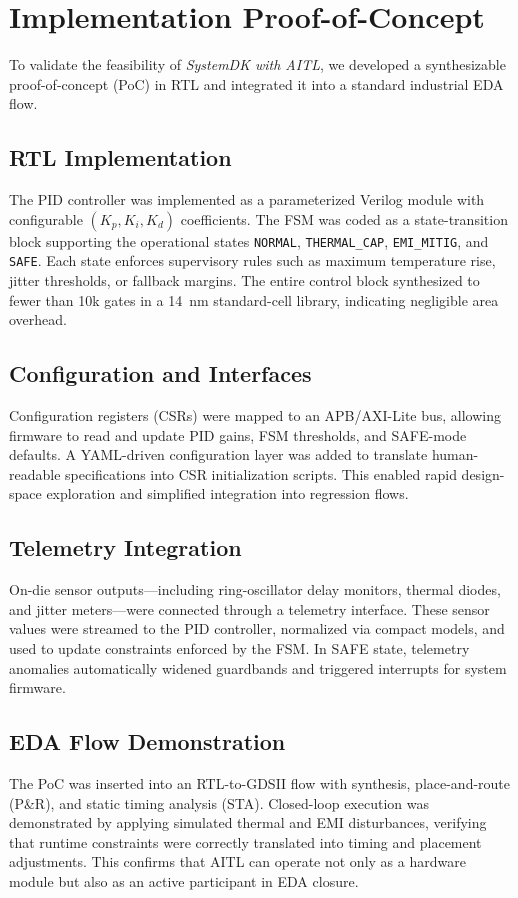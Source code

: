 \documentclass[conference]{IEEEtran}
\begin{document}
\section{Implementation Proof-of-Concept}

To validate the feasibility of \emph{SystemDK with AITL}, we developed a synthesizable proof-of-concept (PoC) in RTL and integrated it into a standard industrial EDA flow.

\subsection{RTL Implementation}
The PID controller was implemented as a parameterized Verilog module with configurable $(K_p,K_i,K_d)$ coefficients. The FSM was coded as a state-transition block supporting the operational states \texttt{NORMAL}, \texttt{THERMAL\_CAP}, \texttt{EMI\_MITIG}, and \texttt{SAFE}. Each state enforces supervisory rules such as maximum temperature rise, jitter thresholds, or fallback margins. The entire control block synthesized to fewer than 10k gates in a \SI{14}{\nano\meter} standard-cell library, indicating negligible area overhead.

\subsection{Configuration and Interfaces}
Configuration registers (CSRs) were mapped to an APB/AXI-Lite bus, allowing firmware to read and update PID gains, FSM thresholds, and SAFE-mode defaults. A YAML-driven configuration layer was added to translate human-readable specifications into CSR initialization scripts. This enabled rapid design-space exploration and simplified integration into regression flows.

\subsection{Telemetry Integration}
On-die sensor outputs—including ring-oscillator delay monitors, thermal diodes, and jitter meters—were connected through a telemetry interface. These sensor values were streamed to the PID controller, normalized via compact models, and used to update constraints enforced by the FSM. In SAFE state, telemetry anomalies automatically widened guardbands and triggered interrupts for system firmware.

\subsection{EDA Flow Demonstration}
The PoC was inserted into an RTL-to-GDSII flow with synthesis, place-and-route (P\&R), and static timing analysis (STA). Closed-loop execution was demonstrated by applying simulated thermal and EMI disturbances, verifying that runtime constraints were correctly translated into timing and placement adjustments. This confirms that AITL can operate not only as a hardware module but also as an active participant in EDA closure.
\end{document}
